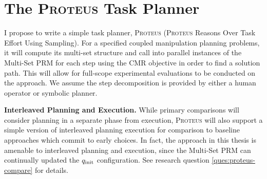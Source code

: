 \clearpage
\section{The \textsc{Proteus} Task Planner}
\label{chap:task-planning}

I propose to write a simple task planner,
\textsc{Proteus}
(\textsc{Proteus} Reasons Over Task Effort Using Sampling).
For a specified coupled manipulation planning problems,
it will compute its multi-set structure
and call into parallel instances of the Multi-Set PRM for each step
using the CMR objective
in order to find a solution path.
This will allow for full-scope experimental evaluations to be conducted
on the approach.
We assume the step decomposition is provided by either
a human operator or symbolic planner.


\textbf{Interleaved Planning and Execution.}
While primary comparisons
will consider planning in a separate phase from execution,
\textsc{Proteus} will also support a simple version of
interleaved planning execution
for comparison to baseline approaches which commit to early choices.
In fact, the approach in this thesis is
amenable to interleaved planning and execution,
since the Multi-Set PRM can continually updated
the $q_{\mbox{\scriptsize init}}$ configuration.
See research question \ref{ques:proteus-compare} for details.
